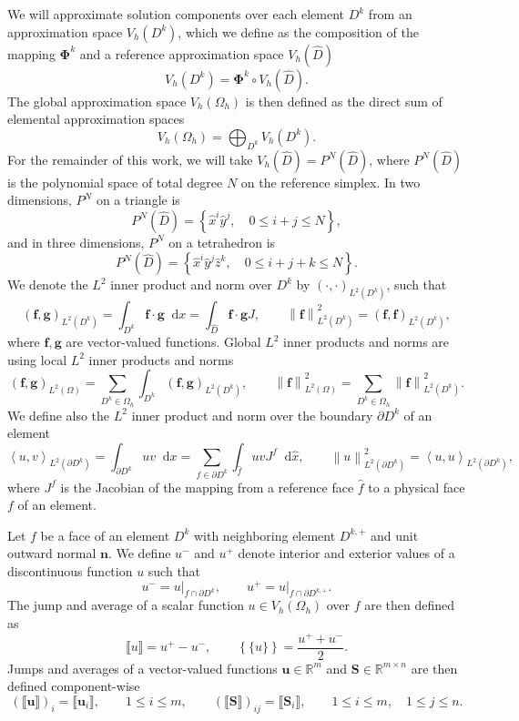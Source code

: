 \documentclass{siamart0216}
\newcommand{\nor}[1]{\left\| #1 \right\|}
\newcommand{\LRp}[1]{\left( #1 \right)}
\newcommand{\LRa}[1]{\left\langle #1 \right\rangle}
\newcommand{\LRc}[1]{\left\{ #1 \right\}}
\newcommand{\LRl}[1]{\left. #1 \right|}
\newcommand{\jump}[1] {\ensuremath{\llbracket#1\rrbracket}}
\newcommand{\avg}[1] {\ensuremath{\LRc{\!\{#1\}\!}}}
\newcommand{\Oh}{{\Omega_h}}
\renewcommand{\L}{L^2\LRp{\Omega}}
\newcommand{\Lk}{L^2\LRp{D^k}}
\newcommand{\Ldk}{L^2\LRp{\partial D^k}}
\newcommand*\diff[1]{\mathop{}\!{\mathrm{d}#1}}
\begin{document}
We will approximate solution components over each element $D^k$ from an approximation space $V_h\LRp{D^k}$, which we define as the composition of the mapping $\bm{\Phi}^k$ and a reference approximation space $V_h\LRp{\widehat{D}}$
\[
V_h\LRp{D^k} = \bm{\Phi}^k \circ V_h\LRp{\widehat{D}}.
\]
The global approximation space $V_h\LRp{\Oh}$ is then defined as the direct sum of elemental approximation spaces
\[
V_h\LRp{\Oh} = \bigoplus_{D^k}V_h\LRp{D^k}.  
\]
For the remainder of this work, we will take $V_h\LRp{\widehat{D}} = P^N\LRp{\widehat{D}}$, where $P^N\LRp{\widehat{D}}$ is the polynomial space of total degree $N$ on the reference simplex.  In two dimensions, $P^N$ on a triangle is
\[
P^N\LRp{\widehat{D}} = \LRc{ \widehat{x}^i \widehat{y}^j, \quad 0 \leq i + j \leq N},
\] 
and in three dimensions, $P^N$ on a tetrahedron is
\[
P^N\LRp{\widehat{D}} = \LRc{ \widehat{x}^i \widehat{y}^j \widehat{z}^k, \quad 0 \leq i + j +k \leq N}.  
\]
We denote the $L^2$ inner product and norm over $D^k$ by $\LRp{\cdot,\cdot}_{\Lk}$, such that
\[
\LRp{\bm{f},\bm{g}}_{\Lk} = \int_{D^k} \bm{f}\cdot\bm{g} \diff x = \int_{\widehat{D}} \bm{f}\cdot\bm{g} J, \qquad \nor{\bm{f}}_{\Lk}^2 = \LRp{\bm{f},\bm{f}}_{\Lk},
\]
where $\bm{f},\bm{g}$ are vector-valued functions.  Global $L^2$ inner products and norms are using local $L^2$ inner products and norms
\[
\LRp{\bm{f},\bm{g}}_{\L} = \sum_{D^k\in \Oh} \int_{D^k} \LRp{\bm{f},\bm{g}}_{\Lk}, \qquad \nor{\bm{f}}_{\L}^2 = \sum_{D^k\in \Oh} \nor{\bm{f}}^2_{\Lk}.
\]
We define also the $L^2$ inner product and norm over the boundary $\partial D^k$ of an element
\[
\LRa{u,v}_{\Ldk} = \int_{\partial D^k}uv\diff{x} = \sum_{f\in \partial D^k}\int_{\widehat{f}}uvJ^f\diff{\widehat{x}}, \qquad \nor{u}_{\Ldk}^2 = \LRa{u,u}_{\Ldk},
\]
where $J^f$ is the Jacobian of the mapping from a reference face $\widehat{f}$ to a physical face $f$ of an element.  

Let $f$ be a face of an element $D^{k}$ with neighboring element $D^{k,+}$ and unit outward normal $\bm{n}$.  We define $u^-$ and $u^+$ denote interior and exterior values of a discontinuous function $u$ such that
\[
{u}^- = \LRl{u}_{f \cap \partial D^k}, \qquad {u}^+ = \LRl{u}_{f \cap  \partial D^{k,+}}.  
\]
The jump and average of a scalar function $u\in V_h\LRp{\Omega_h}$ over $f$ are then defined as
\[
\jump{u} = u^+ - u^-, \qquad \avg{u} = \frac{u^+ + u^-}{2}.
\]
Jumps and averages of a vector-valued functions $\bm{u}\in \mathbb{R}^m$ and $\bm{S}\in \mathbb{R}^{m\times n}$ are then defined component-wise 
\[
\LRp{\jump{\bm{u}}}_i = \jump{\bm{u}_i}, \qquad 1\leq i \leq m, \qquad \LRp{\jump{\bm{S}}}_{ij} = \jump{\bm{S}_i}, \qquad 1\leq i \leq m, \quad 1\leq j \leq n.
\]
\end{document}

